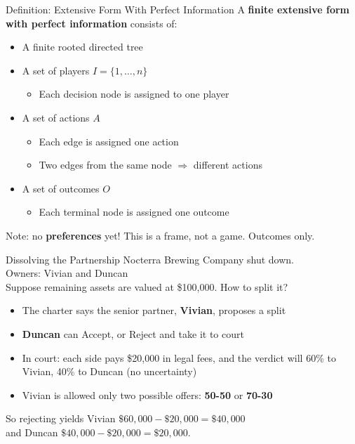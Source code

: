 \begin{frame}{Definition: Extensive Form With Perfect Information}
A \textbf{finite extensive form with perfect information} consists of:
\bsk
\begin{itemize}
    \item A finite rooted directed tree
    \item A set of players $I=\{1,\ldots,n\}$
    \begin{itemize}
        \item Each decision node is assigned to one player
    \end{itemize}
    \item A set of actions $A$
    \begin{itemize}
        \item Each edge is assigned one action
        \item Two edges from the same node $\Rightarrow$ different actions
    \end{itemize}
    \bsk
    \item A set of outcomes $O$
    \begin{itemize}
        \item Each terminal node is assigned one outcome
    \end{itemize}
\end{itemize}
\vfill
Note: no \textbf{preferences} yet! This is a frame, not a game. Outcomes only.
\vspace{-0.3in}
\end{frame}

\begin{frame}{Dissolving the Partnership}
Nocterra Brewing Company shut down.\\
Owners: Vivian and Duncan\\
Suppose remaining assets are valued at \$100,000. How to split it?
\bsk
\begin{itemize}
    \item The charter says the senior partner, \textbf{Vivian}, proposes a split
    \item \textbf{Duncan} can Accept, or Reject and take it to court
    \item In court: each side pays \$20,000 in legal fees, and the verdict
      will 60\% to Vivian, 40\% to Duncan (no uncertainty)
    \item Vivian is allowed only two possible offers: \textbf{50-50} or \textbf{70-30}
\end{itemize}
\bsk
So rejecting yields Vivian $\$60{,}000-\$20{,}000=\$40{,}000$\\
and Duncan
$\$40{,}000-\$20{,}000=\$20{,}000$.
\vspace{-0.3in}
\end{frame}

